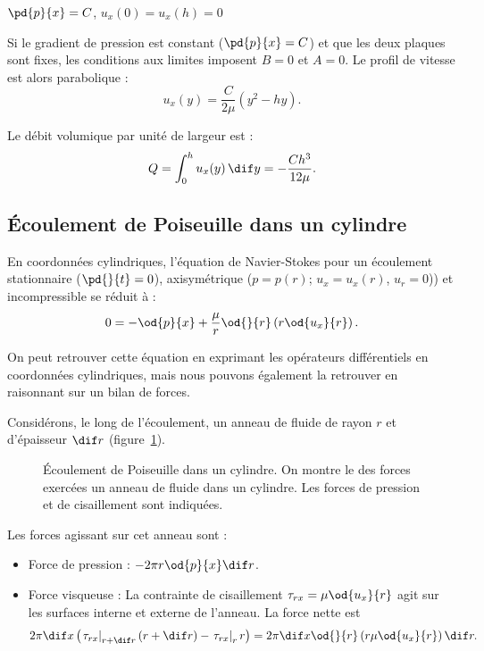 $\pd{p}{x} = C$, $u_x(0) = u_x(h) = 0$


Si le gradient de pression est constant ($\pd{p}{x} = C$) et que les deux plaques sont fixes, les conditions aux limites imposent $B = 0$ et $A = 0$. Le profil de vitesse est alors parabolique :
\begin{displaymath}
u_x(y) = \frac{C}{2\mu} (y^2 - h y).
\end{displaymath}

Le débit volumique par unité de largeur est :
\begin{displaymath}
Q = \int_0^h u_x(y) \, \dif y = -\frac{C h^3}{12\mu}.
\end{displaymath}

\subsection{Écoulement de Poiseuille dans un cylindre}
\label{sec:poiseuille_cylindre}

En coordonnées cylindriques, l'équation de Navier-Stokes pour un écoulement stationnaire ($\pd{}{t}=0$), axisymétrique ($p=p(r)$; $u_x=u_x(r)$, $u_r=0$)) et incompressible se réduit à :
\begin{displaymath}
0 = -\od{p}{x} + \frac{\mu}{r} \od{}{r}\left( r \od{u_x}{r}\right).
\end{displaymath}

On peut retrouver cette équation en exprimant les opérateurs différentiels en coordonnées cylindriques, mais nous pouvons également la retrouver en raisonnant sur un bilan de forces. 

Considérons, le long de l'écoulement,  un anneau de fluide de rayon $r$ et d'épaisseur $\dif r$ (figure~\ref{fig:anneau_cylindre}).

\begin{figure}[h]

\caption{Écoulement de Poiseuille dans un cylindre. On montre le des forces exercées un anneau de fluide dans un cylindre. Les forces de pression et de cisaillement sont indiquées.}
\label{fig:anneau_cylindre}
\end{figure}

Les forces agissant sur cet anneau sont :
\begin{itemize}
    \item Force de pression : $-2\pi r \od{p}{x} \dif r$.
    \item Force visqueuse : La contrainte de cisaillement $\tau_{rx} = \mu \od{u_x}{r}$ agit sur les surfaces interne et externe de l'anneau. La force nette est
    \begin{displaymath}
      2\pi \dif x \left( \left.\tau_{rx}\right|_{r+\dif r}(r + \dif r) - \left.\tau_{rx}\right|_{r} r \right) = 2\pi \dif x  \od{}{r}\left( r \mu \od{u_x}{r}\right) \dif r.
    \end{displaymath}
\end{itemize}

